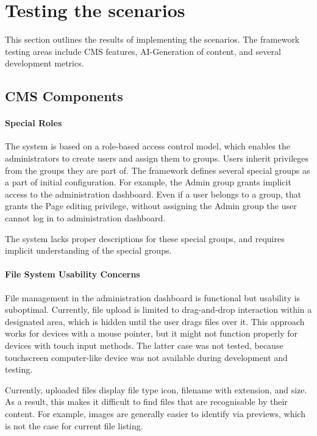 \section{Testing the scenarios}\label{sec:testing-the-scenarios}
This section outlines the results of implementing the scenarios.
The framework testing areas include CMS features, AI-Generation of content, and several development metrics.



\subsection{CMS Components}\label{subsec:cms-components}
\paragraph{Special Roles}
The system is based on a role-based access control model, which enables the administrators to create users
and assign them to groups.
Users inherit privileges from the groups they are part of.
The framework defines several special groups as a part of initial configuration.
For example, the Admin group grants implicit access to the administration dashboard.
Even if a user belongs to a group,
that grants the Page editing privilege,
without assigning the Admin group the user cannot log in to administration dashboard.

The system lacks proper descriptions for these special groups, and requires implicit understanding of the special groups.

\paragraph{File System Usability Concerns}
File management in the administration dashboard is functional but usability is suboptimal.
Currently, file upload is limited to drag-and-drop interaction within a designated area, which is hidden until
the user drags files over it.
This approach works for devices with a mouse pointer, but it might not function properly for devices with touch input methods.
The latter case was not tested, because touchscreen computer-like device was not available during development and testing.

Currently, uploaded files display file type icon, filename with extension, and size.
As a result, this makes it difficult to find files that are recognisable by their content.
For example, images are generally easier to identify via previews, which is not the case for current file listing.

